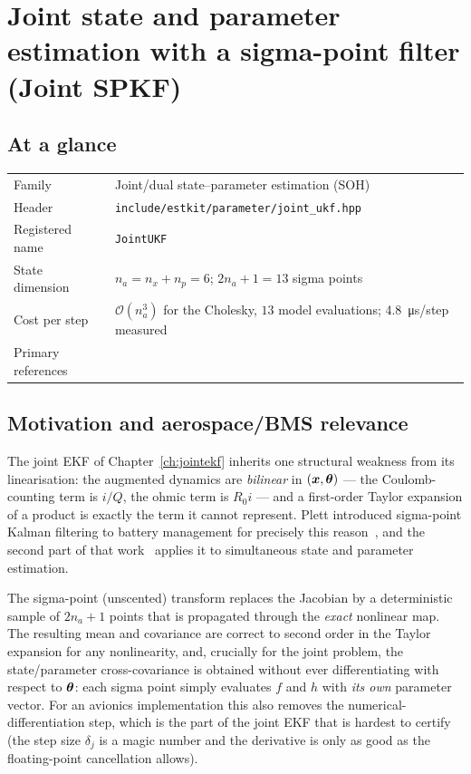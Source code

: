 \chapter{Joint state and parameter estimation with a sigma-point filter (Joint SPKF)}
\label{ch:jointukf}

\section*{At a glance}
\begin{tabular}{@{}l>{\raggedright\arraybackslash}p{}@{}}
Family & Joint/dual state--parameter estimation (SOH) \\
Header & \texttt{include/estkit/parameter/joint\_ukf.hpp} \\
Registered name & \texttt{JointUKF} \\
State dimension & $n_a = n_x + n_p = 6$; $2n_a+1=13$ sigma points \\
Cost per step & $\mathcal{O}(n_a^3)$ for the Cholesky, $13$ model evaluations; \SI{4.8}{\micro\second}/step measured \\
Primary references & \cite{plett2006spkf2,plett2006spkf1,wan2000ukf,julier2004unscented,ljung1979ekf} \\
\end{tabular}

\section{Motivation and aerospace/BMS relevance}
The joint EKF of Chapter~\ref{ch:jointekf} inherits one structural weakness from its linearisation:
the augmented dynamics are \emph{bilinear} in $(\bm{x},\bm{\theta})$ --- the Coulomb-counting term is
$i/Q$, the ohmic term is $R_0 i$ --- and a first-order Taylor expansion of a product is exactly the
term it cannot represent.  Plett introduced sigma-point Kalman filtering to battery management for
precisely this reason~\cite{plett2006spkf1}, and the second part of that work~\cite{plett2006spkf2}
applies it to simultaneous state and parameter estimation.

The sigma-point (unscented) transform replaces the Jacobian by a deterministic sample of $2n_a+1$
points that is propagated through the \emph{exact} nonlinear map.  The resulting mean and
covariance are correct to second order in the Taylor expansion for any nonlinearity, and, crucially
for the joint problem, the state/parameter cross-covariance is obtained without ever differentiating
with respect to $\bm{\theta}$: each sigma point simply evaluates $f$ and $h$ with \emph{its own}
parameter vector.  For an avionics implementation this also removes the numerical-differentiation
step, which is the part of the joint EKF that is hardest to certify (the step size $\delta_j$ is a
magic number and the derivative is only as good as the floating-point cancellation allows).

